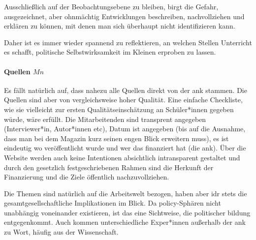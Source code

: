 Ausschließlich auf der Beobachtungsebene zu bleiben, birgt die Gefahr, ausgezeichnet, aber ohnmächtig Entwicklungen beschreiben, nachvollziehen und erklären zu können, mit denen man sich überhaupt nicht identifizieren kann. 

Daher ist es immer wieder spannend zu reflektieren, an welchen Stellen Unterricht es schafft, politische Selbstwirksamkeit im Kleinen erproben zu lassen.  


\paragraph{Quellen  $Mn$}
Es fällt natürlich auf, dass nahezu alle Quellen direkt von der \gls{ank} stammen.
Die Quellen sind aber von vergleichsweise hoher Qualität. Eine einfache Checkliste, wie sie vielleicht zur ersten Qualitätseinschätzung an Schüler*innen gegeben würde, wäre erfüllt. Die Mitarbeitenden sind transprent angegeben (Interviewer*in, Autor*innen \gls{etc}), Datum  ist angegeben (bis auf die Ausnahme, dass man bei dem Magazin kurz seinen engen Blick erweitern muss), es ist eindeutig wo veröffentlicht wurde und wer das finanziert hat (die \gls{ank}). Über die Website werden auch keine Intentionen absichtlich intransparent gestaltet und durch den gesetzlich festgeschriebenen Rahmen sind die Herkunft der Finanzierung und die Ziele öffentlich nachzuvollziehen. 

Die Themen sind natürlich auf die Arbeitswelt bezogen, haben aber \gls{idr} stets die gesamtgesellschaftliche Implikationen im Blick. Da policy-Sphären nicht unabhängig voneinander existieren, ist das eine Sichtweise, die politischer bildung entgegenkommt. 
Auch kommen unterschiedliche Exper*innen außerhalb der \gls{ank} zu Wort, häufig aus der Wissenschaft.

